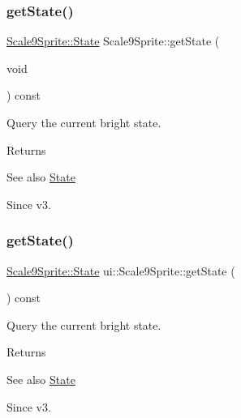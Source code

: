 \subsubsection{\texorpdfstring{get\+State()}{getState()}\hspace{0.1cm}{\footnotesize\ttfamily [1/2]}}
{\footnotesize\ttfamily \hyperlink{classui_1_1Scale9Sprite_a6580c2817c63b7a2461c48378b199d79}{Scale9\+Sprite\+::\+State} Scale9\+Sprite\+::get\+State (\begin{DoxyParamCaption}\item[{void}]{ }\end{DoxyParamCaption}) const}

Query the current bright state. \begin{DoxyReturn}{Returns}

\end{DoxyReturn}
\begin{DoxySeeAlso}{See also}
{\ttfamily \hyperlink{classui_1_1Scale9Sprite_a6580c2817c63b7a2461c48378b199d79}{State}} 
\end{DoxySeeAlso}
\begin{DoxySince}{Since}
v3. 
\end{DoxySince}
\mbox{\label{classui_1_1Scale9Sprite_a40c18c08c008a74031f25dd296e0e560}} 
\subsubsection{\texorpdfstring{get\+State()}{getState()}\hspace{0.1cm}{\footnotesize\ttfamily [2/2]}}
{\footnotesize\ttfamily \hyperlink{classui_1_1Scale9Sprite_a6580c2817c63b7a2461c48378b199d79}{Scale9\+Sprite\+::\+State} ui\+::\+Scale9\+Sprite\+::get\+State (\begin{DoxyParamCaption}{ }\end{DoxyParamCaption}) const}

Query the current bright state. \begin{DoxyReturn}{Returns}

\end{DoxyReturn}
\begin{DoxySeeAlso}{See also}
{\ttfamily \hyperlink{classui_1_1Scale9Sprite_a6580c2817c63b7a2461c48378b199d79}{State}} 
\end{DoxySeeAlso}
\begin{DoxySince}{Since}
v3. 
\end{DoxySince}
\mbox{\label{classui_1_1Scale9Sprite_a9511895e36dc78a97a39aaf58f56d2ea}} 
